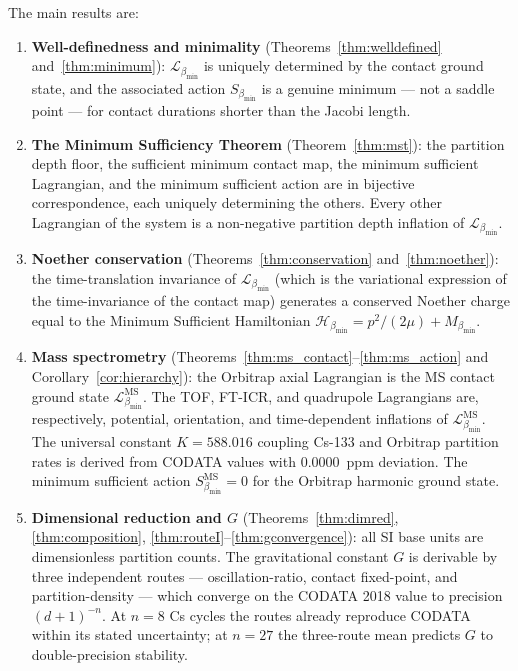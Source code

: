 \documentclass[11pt,twocolumn,a4paper]{article}
\theoremstyle{plain}
\theoremstyle{definition}
\theoremstyle{remark}
\newcommand{\bmin}{\beta_{\min}}
\newcommand{\Lmin}{\mathcal{L}_{\bmin}}
\newcommand{\Smin}{S_{\bmin}}
\newcommand{\Hmin}{\mathcal{H}_{\bmin}}
\begin{document}
The main results are:

\begin{enumerate}
\item \textbf{Well-definedness and minimality} (Theorems~\ref{thm:welldefined}
  and~\ref{thm:minimum}): $\Lmin$ is uniquely determined by the contact ground
  state, and the associated action $\Smin$ is a genuine minimum --- not a
  saddle point --- for contact durations shorter than the Jacobi length.

\item \textbf{The Minimum Sufficiency Theorem} (Theorem~\ref{thm:mst}): the
  partition depth floor, the sufficient minimum contact map, the minimum
  sufficient Lagrangian, and the minimum sufficient action are in bijective
  correspondence, each uniquely determining the others. Every other Lagrangian
  of the system is a non-negative partition depth inflation of $\Lmin$.

\item \textbf{Noether conservation} (Theorems~\ref{thm:conservation}
  and~\ref{thm:noether}): the time-translation invariance of $\Lmin$ (which
  is the variational expression of the time-invariance of the contact map)
  generates a conserved Noether charge equal to the Minimum Sufficient
  Hamiltonian $\Hmin = p^2/(2\mu) + M_{\bmin}$.

\item \textbf{Mass spectrometry} (Theorems~\ref{thm:ms_contact}--\ref{thm:ms_action}
  and Corollary~\ref{cor:hierarchy}): the Orbitrap axial Lagrangian is the
  MS contact ground state $\Lmin^{\mathrm{MS}}$. The TOF, FT-ICR, and
  quadrupole Lagrangians are, respectively, potential, orientation, and
  time-dependent inflations of $\Lmin^{\mathrm{MS}}$. The universal constant
  $K = 588.016$ coupling Cs-133 and Orbitrap partition rates is derived from
  CODATA values with $0.0000$~ppm deviation. The minimum sufficient action
  $\Smin^{\mathrm{MS}} = 0$ for the Orbitrap harmonic ground state.

\item \textbf{Dimensional reduction and $G$} (Theorems~\ref{thm:dimred},
  \ref{thm:composition}, \ref{thm:routeI}--\ref{thm:gconvergence}): all SI
  base units are dimensionless partition counts. The gravitational constant $G$
  is derivable by three independent routes --- oscillation-ratio, contact
  fixed-point, and partition-density --- which converge on the CODATA 2018
  value to precision $(d+1)^{-n}$. At $n = 8$ Cs cycles the routes already
  reproduce CODATA within its stated uncertainty; at $n = 27$ the three-route
  mean predicts $G$ to double-precision stability.


\end{enumerate}
\end{document}
